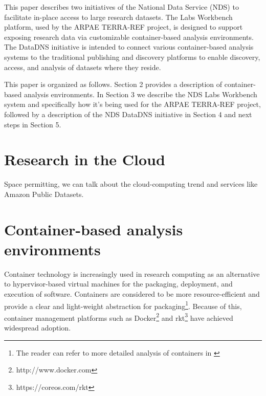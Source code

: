 \documentclass{sig-alternate}
\begin{document}
This paper describes two initiatives of the National Data Service (NDS) to facilitate in-place access to large research datasets. The Labs Workbench platform, used by the ARPAE TERRA-REF project, is designed to support exposing research data via customizable container-based analysis environments.  The DataDNS initiative is intended to connect various container-based analysis systems to the traditional publishing and discovery platforms to enable discovery, access, and analysis of datasets where they reside.




This paper is organized as follows.  Section 2 provides a description of container-based analysis environments.  In Section 3 we describe the NDS Labs Workbench system and specifically how it's being used for the ARPAE TERRA-REF project, followed by a description of the NDS DataDNS initiative in Section 4 and next steps in Section 5.

\section{Research in the Cloud}
Space permitting, we can talk about the cloud-computing trend and services like Amazon Public Datasets.


\section{Container-based analysis environments}

Container technology is increasingly used in research computing as an alternative to hypervisor-based virtual machines for the packaging, deployment, and execution of software. Containers are considered to be more resource-efficient and provide a clear and light-weight abstraction for packaging\footnote{The reader can refer to more detailed analysis of containers in \cite{Soltesz:2007:COS:1272998.1273025,7095802,7036275}}.  Because of this, container management platforms such as Docker\footnote{http://www.docker.com} and rkt\footnote{https://coreos.com/rkt} have achieved widespread adoption.
\end{document}
